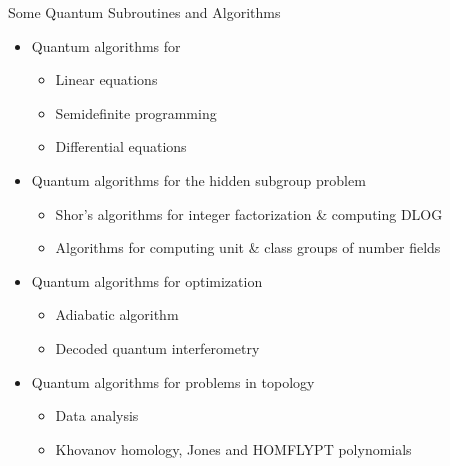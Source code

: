 \documentclass[handout]{beamer} %
\renewcommand{\>}{\rangle}
\newcommand{\<}{\langle}
\theoremstyle{definition}
\begin{document}

\begin{frame}{Some Quantum Subroutines and Algorithms}
\begin{itemize}
    \item Quantum algorithms for
    \begin{itemize}
        \item Linear equations 
        \item Semidefinite programming
        \item Differential equations
    \end{itemize}
    \medskip
    \item Quantum algorithms for the hidden subgroup problem 
    \begin{itemize}
        \item Shor's algorithms for integer factorization \& computing DLOG
        \item Algorithms for computing unit \& class groups of number fields
    \end{itemize}
    \medskip
    \item Quantum algorithms for optimization
    \begin{itemize}
        \item Adiabatic algorithm
        \item Decoded quantum interferometry
    \end{itemize}
    \medskip
    \item Quantum algorithms for problems in topology
    \begin{itemize}
        \item Data analysis
        \item Khovanov homology, Jones and HOMFLYPT polynomials
    \end{itemize}
\end{itemize}
\end{frame}

\end{document}
